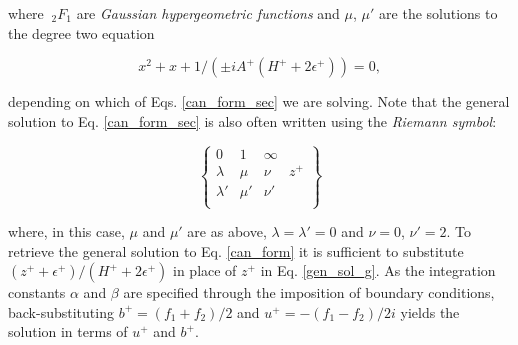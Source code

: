 where $\ _2F_1$ are \emph{Gaussian hypergeometric functions} and $\mu$, $\mu'$ are the solutions to the degree two equation
%
\begin{linenomath*}
\begin{equation*}
	x^2+x+1/(\pm i A^+(H^++2 \epsilon^+))=0,
\end{equation*}
\end{linenomath*}
%
depending on which of Eqs. \ref{can_form_sec} we are solving.
Note that the general solution to Eq. \ref{can_form_sec} is also often written using the \emph{Riemann symbol}:
%
\begin{linenomath*}
\begin{equation*}
\left \{
\begin{array}{cccc}
0 & 1 & \infty &  \\
\lambda & \mu & \nu & z^+\\
\lambda' & \mu' & \nu' & \\
\end{array}
\right \}
\end{equation*}
\end{linenomath*}
%
where, in this case, $\mu$ and $\mu'$ are as above, $\lambda=\lambda'=0$ and $\nu=0$, $\nu'=2$.
%
To retrieve the general solution to Eq. \ref{can_form} it is sufficient to substitute $(z^++\epsilon^+)/(H^+ +2 \epsilon^+)$ in place of $z^+$ in Eq. \ref{gen_sol_g}.
As the integration constants $\alpha$ and $\beta$ are specified through the imposition of boundary conditions, back-substituting $b^+ = (f_1+f_2)/2$ and $u^+ = -(f_1-f_2)/2i$ yields the solution in terms of $u^+$ and $b^+$.

